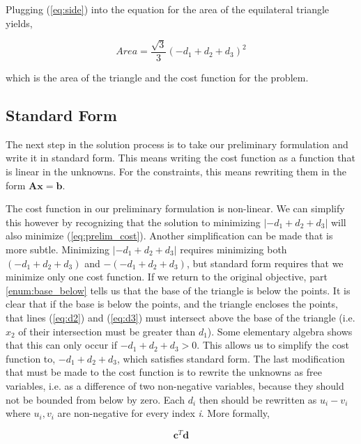 \documentclass{article}
\begin{document}
\noindent Plugging (\ref{eq:side}) into the equation for the area of the equilateral triangle yields,

\begin{equation} \label{eq:prelim_cost}
Area = \frac{\sqrt{3}}{3}(-d_1 + d_2 + d_3)^2
\end{equation}

\noindent which is the area of the triangle and the cost function for the problem.

\subsection{Standard Form}

The next step in the solution process is to take our preliminary formulation and write it in standard form.
This means writing the cost function as a function that is linear in the unknowns. For the constraints, this means rewriting them in the form $\mathbf{A} \mathbf{x} = \mathbf{b}$.

The cost function in our preliminary formulation is non-linear.
We can simplify this however by recognizing that the solution to minimizing $|-d_1 + d_2 + d_3|$ will also minimize (\ref{eq:prelim_cost}).
Another simplification can be made that is more subtle.
Minimizing $|-d_1 + d_2 + d_3|$ requires minimizing both $(-d_1 + d_2 + d_3)$ and $-(-d_1 + d_2 + d_3)$, but standard form requires that we minimize only one cost function.
If we return to the original objective, part \ref{enum:base_below} tells us that the base of the triangle is below the points.
It is clear that if the base is below the points, and the triangle encloses the points, that lines (\ref{eq:d2}) and (\ref{eq:d3}) must intersect above the base of the triangle (i.e. $x_2$ of their intersection must be greater than $d_1$).
Some elementary algebra shows that this can only occur if $-d_1 + d_2 + d_3 > 0$.
This allows us to simplify the cost function to, $-d_1 + d_2 + d_3$, which satisfies standard form.
The last modification that must be made to the cost function is to rewrite the unknowns as free variables, i.e. as a difference of two non-negative variables, because they should not be bounded from below by zero.
Each $d_i$ then should be rewritten as $u_i - v_i$ where $u_i, v_i$ are non-negative for every index \textit{i}.
More formally,

\begin{equation} \label{eq:lp_cost}
\mathbf{c}^T \mathbf{d}
\end{equation}
\end{document}
